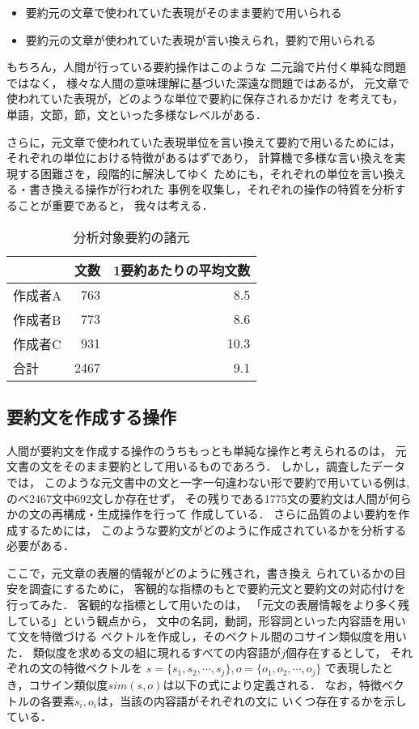 \begin{itemize}
\item 要約元の文章で使われていた表現がそのまま要約で用いられる
\item 要約元の文章が使われていた表現が言い換えられ，要約で用いられる
\end{itemize}

もちろん，人間が行っている要約操作はこのような
二元論で片付く単純な問題ではなく，
様々な人間の意味理解に基づいた深遠な問題ではあるが，
元文章で使われていた表現が，どのような単位で要約に保存されるかだけ
を考えても，単語，文節，節，文といった多様なレベルがある．

さらに，元文章で使われていた表現単位を言い換えて要約で用いるためには，
それぞれの単位における特徴があるはずであり，
計算機で多様な言い換えを実現する困難さを，段階的に解決してゆく
ためにも，それぞれの単位を言い換える・書き換える操作が行われた
事例を収集し，それぞれの操作の特質を分析することが重要であると，
我々は考える．

\begin{table}
\caption{分析対象要約の諸元} 
\label{basicdata}
\begin{center}
\begin{tabular}{|l|r|r|}
\hline
        &文数  &1要約あたりの平均文数 \\ \hline \hline
作成者A & 763  & 8.5\\
作成者B & 773  & 8.6\\
作成者C & 931  & 10.3\\ \hline
合計    & 2467 & 9.1 \\ \hline
\end{tabular}
\end{center}
\end{table}

\subsection{要約文を作成する操作}

人間が要約文を作成する操作のうちもっとも単純な操作と考えられるのは，
元文書の文をそのまま要約として用いるものであろう．
しかし，調査したデータでは，
このような元文書中の文と一字一句違わない形で要約で用いている例は,
のべ2467文中692文しか存在せず，
その残りである1775文の要約文は人間が何らかの文の再構成・生成操作を行って
作成している．
さらに品質のよい要約を作成するためには，
このような要約文がどのように作成されているかを分析する必要がある．

ここで，元文章の表層的情報がどのように残され，書き換え
られているかの目安を調査にするために，
客観的な指標のもとで要約元文と要約文の対応付けを行ってみた．
客観的な指標として用いたのは，
「元文の表層情報をより多く残している」という観点から，
文中の名詞，動詞，形容詞といった内容語を用いて文を特徴づける
ベクトルを作成し，そのベクトル間のコサイン類似度を用いた．
類似度を求める文の組に現れるすべての内容語が$j$個存在するとして，
それぞれの文の特徴ベクトルを
$s=\{s_1,s_2,\cdots,s_j\},o=\{o_1,o_2,\cdots,o_j\}$
で表現したとき，コサイン類似度$sim(s,o)$は以下の式により定義される．
なお，特徴ベクトルの各要素$s_i,o_i$は，当該の内容語がそれぞれの文に
いくつ存在するかを示している．


